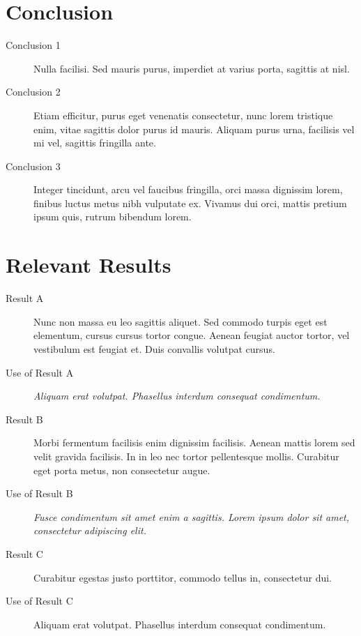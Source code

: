 \documentclass[10pt,letterpaper,twocolumn,landscape]{article}
\begin{document}
\section{Conclusion}

\begin{description}
	\item [Conclusion 1] Nulla facilisi. Sed mauris purus, imperdiet at varius porta, sagittis at nisl.
    \item [Conclusion 2] Etiam efficitur, purus eget venenatis consectetur, nunc lorem tristique enim, vitae sagittis dolor purus id mauris. Aliquam purus urna, facilisis vel mi vel, sagittis fringilla ante.
    \item [Conclusion 3] Integer tincidunt, arcu vel faucibus fringilla, orci massa dignissim lorem, finibus luctus metus nibh vulputate ex. Vivamus dui orci, mattis pretium ipsum quis, rutrum bibendum lorem.
\end{description}



\section{Relevant Results}

\begin{description}
	\item [Result A] Nunc non massa eu leo sagittis aliquet. Sed commodo turpis eget est elementum, cursus cursus tortor congue. Aenean feugiat auctor tortor, vel vestibulum est feugiat et. Duis convallis volutpat cursus. 
    \item [Use of Result A] \emph{Aliquam erat volutpat. Phasellus interdum consequat condimentum.}
    \item [Result B] Morbi fermentum facilisis enim dignissim facilisis. Aenean mattis lorem sed velit gravida facilisis. In in leo nec tortor pellentesque mollis. Curabitur eget porta metus, non consectetur augue. 
    \item [Use of Result B] \emph{Fusce condimentum sit amet enim a sagittis. Lorem ipsum dolor sit amet, consectetur adipiscing elit.}
    \item [Result C] Curabitur egestas justo porttitor, commodo tellus in, consectetur dui.
    \item [Use of Result C] Aliquam erat volutpat. Phasellus interdum consequat condimentum. 
\end{description}
\end{document}
